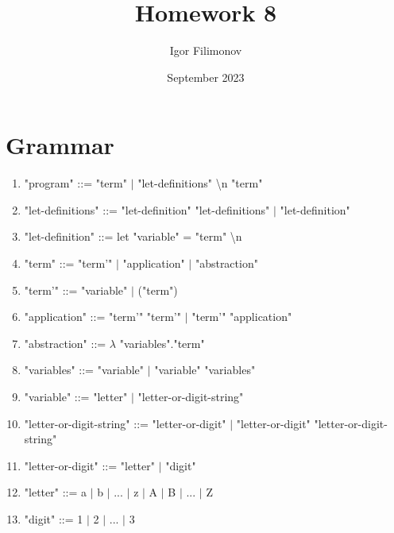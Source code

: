 \documentclass{article}
\title{Homework 8}
\author{Igor Filimonov}
\date{September 2023}
\begin{document}
\maketitle

\section{Grammar}
\begin{enumerate}
    \item "program" ::= "term" $\vert$ "let-definitions" \textbackslash n "term"
    \item "let-definitions" ::= "let-definition" "let-definitions" $\vert$ "let-definition"
    \item "let-definition" ::= let "variable" = "term" \textbackslash n
    \item "term" ::= "term'" $\vert$ "application" $\vert$ "abstraction"
    \item "term'" ::= "variable" $\vert$ ("term")
    \item "application" ::= "term'" "term'" $\vert$ "term'" "application"
    \item "abstraction" ::= $\lambda$ "variables"."term"
    \item "variables" ::= "variable" $\vert$ "variable" "variables"
    \item "variable" ::= "letter" $\vert$ "letter-or-digit-string"
    \item "letter-or-digit-string" ::= "letter-or-digit" $\vert$ "letter-or-digit" "letter-or-digit-string"
    \item "letter-or-digit" ::= "letter" $\vert$ "digit"
    \item "letter" ::= a $\vert$ b $\vert$ ... $\vert$ z $\vert$ A $\vert$ B $\vert$ ... $\vert$ Z
    \item "digit" ::= 1 $\vert$ 2 $\vert$ ... $\vert$ 3
\end{enumerate}
\end{document}
